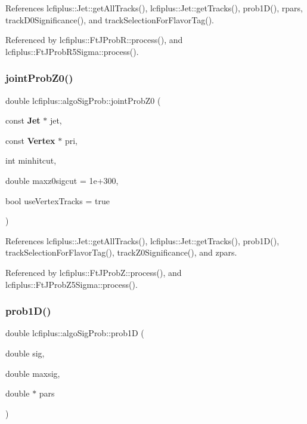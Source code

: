 References lcfiplus\+::\+Jet\+::get\+All\+Tracks(), lcfiplus\+::\+Jet\+::get\+Tracks(), prob1\+D(), rpars, track\+D0\+Significance(), and track\+Selection\+For\+Flavor\+Tag().



Referenced by lcfiplus\+::\+Ft\+J\+Prob\+R\+::process(), and lcfiplus\+::\+Ft\+J\+Prob\+R5\+Sigma\+::process().

\mbox{\label{namespacelcfiplus_1_1algoSigProb_a83e6934a5303236ffb68cb8e9a8c34b0}} 
\subsubsection{joint\+Prob\+Z0()}
{\footnotesize\ttfamily double lcfiplus\+::algo\+Sig\+Prob\+::joint\+Prob\+Z0 (\begin{DoxyParamCaption}\item[{const \textbf{ Jet} $\ast$}]{jet,  }\item[{const \textbf{ Vertex} $\ast$}]{pri,  }\item[{int}]{minhitcut,  }\item[{double}]{maxz0sigcut = {\ttfamily 1e+300},  }\item[{bool}]{use\+Vertex\+Tracks = {\ttfamily true} }\end{DoxyParamCaption})}



References lcfiplus\+::\+Jet\+::get\+All\+Tracks(), lcfiplus\+::\+Jet\+::get\+Tracks(), prob1\+D(), track\+Selection\+For\+Flavor\+Tag(), track\+Z0\+Significance(), and zpars.



Referenced by lcfiplus\+::\+Ft\+J\+Prob\+Z\+::process(), and lcfiplus\+::\+Ft\+J\+Prob\+Z5\+Sigma\+::process().

\mbox{\label{namespacelcfiplus_1_1algoSigProb_a8f69d75be4c24b3b7996e4ba2abff275}} 
\subsubsection{prob1\+D()}
{\footnotesize\ttfamily double lcfiplus\+::algo\+Sig\+Prob\+::prob1D (\begin{DoxyParamCaption}\item[{double}]{sig,  }\item[{double}]{maxsig,  }\item[{double $\ast$}]{pars }\end{DoxyParamCaption})}



